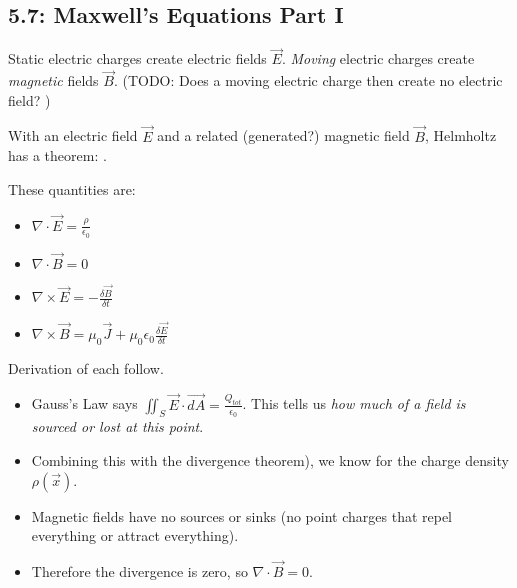 \documentclass[11pt, oneside]{article}   	%
\begin{document}
\subsection{5.7: Maxwell's Equations Part I}

Static electric charges create electric fields $\vec{E}$.  \emph{Moving} electric charges create \emph{magnetic} fields $\vec{B}$.  (TODO: Does a moving electric charge then create no electric field?  )


With an electric field $\vec{E}$ and a related (generated?) magnetic field $\vec{B}$, Helmholtz has a theorem: .

These quantities are:

\begin{itemize}
\item $\nabla \cdot \vec{E} =  \frac{\rho}{\epsilon_0}$
\item $\nabla \cdot \vec{B} = 0$
\item $\nabla \times \vec{E} = -\frac{\delta \vec{B}}{\delta t}$
\item $\nabla \times \vec{B} = \mu_0\vec{J} + \mu_0 \epsilon_0  \frac{\delta \vec{E}}{\delta t}$
\end{itemize}

Derivation of each follow.



\begin{itemize}
\item Gauss's Law says $\iint_S \vec{E} \cdot \vec{dA} = \frac{Q_{tot}}{\epsilon_0}$.  This tells us \emph{how much of a field is sourced or lost at this point}.
\item Combining this with the divergence theorem), we know  for the charge density $\rho(\vec{x})$.
\end{itemize}


\begin{itemize}
\item Magnetic fields have no sources or sinks (no point charges that repel everything or attract everything).
\item Therefore the divergence is zero, so  $\nabla \cdot \vec{B} = 0$.
\end{itemize}
\end{document}
